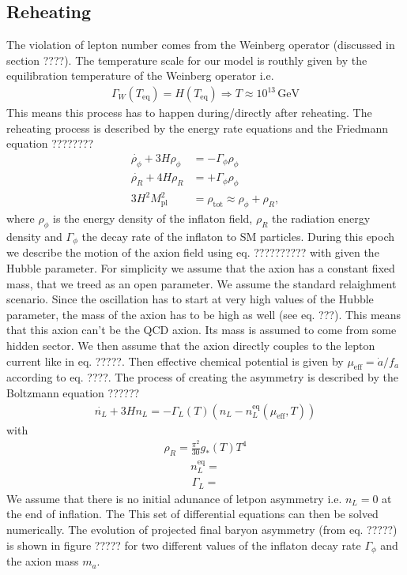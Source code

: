 \documentclass[13pt,a4paper,twoside,titlepage]{article}
\begin{document}
\subsection{Reheating}
The violation of lepton number comes from the Weinberg operator (discussed in section ????).
The temperature scale for our model is routhly given by the equilibration temperature of the Weinberg operator i.e.
\begin{align}
    \Gamma_W(T_\mathrm{eq}) = H(T_\mathrm{eq}) \Rightarrow T \approx 10^{13} \, \mathrm{GeV}
\end{align}
This means this process has to happen during/directly after reheating. The reheating process is described by the energy rate equations and the Friedmann equation ????????
\begin{align}
    \dot{\rho_\phi} + 3 H \rho_\phi &= - \Gamma_\phi \rho_\phi \\
    \dot{\rho_R} + 4 H \rho_R &= + \Gamma_\phi \rho_\phi \\
    3 H^2 M_\mathrm{pl}^2 &= \rho_\mathrm{tot} \approx \rho_\phi + \rho_R,
\end{align}
where $\rho_\phi$ is the energy density of the inflaton field, $\rho_R$ the radiation energy density and $\Gamma_\phi$ the decay rate of the inflaton to SM particles.
During this epoch we describe the motion of the axion field using eq. ?????????? with given the Hubble parameter.
For simplicity we assume that the axion has a constant fixed mass, that we treed as an open parameter. We assume the standard relaighment scenario. Since the oscillation has to start at very high values of the Hubble parameter, the mass of the axion has to be high as well (see eq. ???).
This means that this axion can't be the QCD axion. Its mass is assumed to come from some hidden sector.
We then assume that the axion directly couples to the lepton current like in eq. ?????. Then effective chemical potential is given by $\mu_\mathrm{eff} = \dot{a}/f_a$ according to eq. ????.
The process of creating the asymmetry is described by the Boltzmann equation ??????
\begin{align}
    \dot{n_L} + 3 H n_L = - \Gamma_L(T) (n_L - n_L^\mathrm{eq}(\mu_\mathrm{eff}, T))
\end{align}
with
\begin{align}
    \rho_R = \frac{\pi^2}{30} g_{*}(T) T^4
\end{align}
\begin{align}
    n_L^\mathrm{eq} =
\end{align}
\begin{align}
    \Gamma_L =
\end{align}
We assume that there is no initial adunance of letpon asymmetry i.e. $n_L = 0$ at the end of inflation.
The
This set of differential equations can then be solved numerically. The evolution of projected final baryon asymmetry (from eq. ?????) is shown in figure ????? for two different values of the inflaton decay rate $\Gamma_\phi$ and the axion mass $m_a$.
\end{document}
